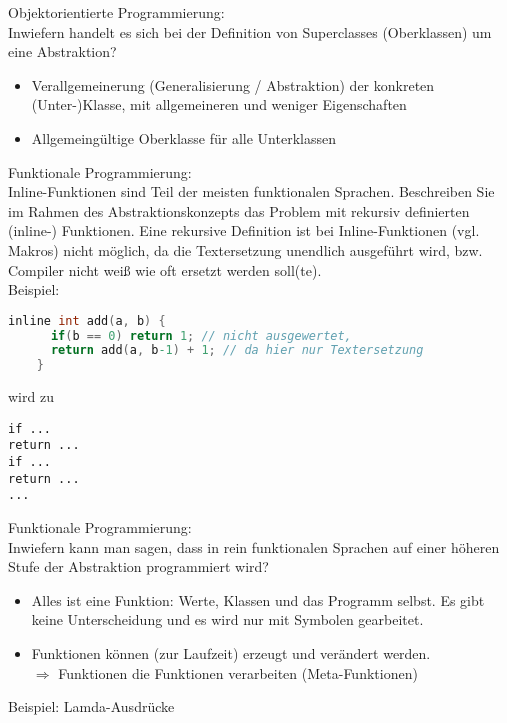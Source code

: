 \begin{card}
	Objektorientierte Programmierung:\\
	Inwiefern handelt es sich bei der Definition von Superclasses (Oberklassen) um eine Abstraktion?
	\hr
	\begin{itemize}
    \item Verallgemeinerung (Generalisierung / Abstraktion) der konkreten (Unter-)Klasse, mit allgemeineren und weniger Eigenschaften
	\item Allgemeingültige Oberklasse für alle Unterklassen
	\end{itemize}
\end{card}

\begin{card}
	Funktionale Programmierung:\\
	Inline-Funktionen sind Teil der meisten funktionalen Sprachen. Beschreiben Sie im Rahmen des Abstraktionskonzepts das Problem mit rekursiv definierten (inline-) Funktionen.
	\hr
	Eine rekursive Definition ist bei Inline-Funktionen (vgl. Makros) nicht möglich, da die Textersetzung unendlich ausgeführt wird, bzw. Compiler nicht weiß wie oft ersetzt werden soll(te).\\
	Beispiel:\\
	\begin{lstlisting}[language=C]
	inline int add(a, b) {
	  if(b == 0) return 1; // nicht ausgewertet,
	  return add(a, b-1) + 1; // da hier nur Textersetzung
	}
	\end{lstlisting}

	wird zu

  \begin{lstlisting}
if ...
return ...
if ...
return ...
...
  \end{lstlisting}

\end{card}

\begin{card}
	Funktionale Programmierung:\\
	Inwiefern kann man sagen, dass in rein funktionalen Sprachen auf einer höheren Stufe der Abstraktion programmiert wird?
	\hr
	\begin{itemize}
	\item Alles ist eine Funktion: Werte, Klassen und das Programm selbst. Es gibt keine Unterscheidung und es wird nur
	  mit Symbolen gearbeitet.
	\item Funktionen können (zur Laufzeit) erzeugt und verändert werden.\\
	  $\Rightarrow$ Funktionen die Funktionen verarbeiten (Meta-Funktionen)

	\end{itemize}
	Beispiel: Lamda-Ausdrücke
\end{card}

